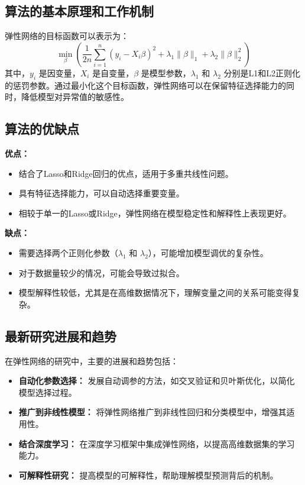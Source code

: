 \subsection*{算法的基本原理和工作机制}
弹性网络的目标函数可以表示为：
\[
    \min_{\beta} \left( \frac{1}{2n} \sum_{i=1}^{n} (y_i - X_i\beta)^2 + \lambda_1 \|\beta\|_1 + \lambda_2 \|\beta\|_2^2 \right)
\]
其中，\(y_i\) 是因变量，\(X_i\) 是自变量，\(\beta\) 是模型参数，\(\lambda_1\) 和 \(\lambda_2\) 分别是L1和L2正则化的惩罚参数。通过最小化这个目标函数，弹性网络可以在保留特征选择能力的同时，降低模型对异常值的敏感性。

\subsection*{算法的优缺点}
\textbf{优点：}
\begin{itemize}
    \item 结合了Lasso和Ridge回归的优点，适用于多重共线性问题。
    \item 具有特征选择能力，可以自动选择重要变量。
    \item 相较于单一的Lasso或Ridge，弹性网络在模型稳定性和解释性上表现更好。
\end{itemize}

\textbf{缺点：}
\begin{itemize}
    \item 需要选择两个正则化参数（\(\lambda_1\) 和 \(\lambda_2\)），可能增加模型调优的复杂性。
    \item 对于数据量较少的情况，可能会导致过拟合。
    \item 模型解释性较低，尤其是在高维数据情况下，理解变量之间的关系可能变得复杂。
\end{itemize}

\subsection*{最新研究进展和趋势}
在弹性网络的研究中，主要的进展和趋势包括：
\begin{itemize}
    \item \textbf{自动化参数选择：} 发展自动调参的方法，如交叉验证和贝叶斯优化，以简化模型选择过程。
    \item \textbf{推广到非线性模型：} 将弹性网络推广到非线性回归和分类模型中，增强其适用性。
    \item \textbf{结合深度学习：} 在深度学习框架中集成弹性网络，以提高高维数据集的学习能力。
    \item \textbf{可解释性研究：} 提高模型的可解释性，帮助理解模型预测背后的机制。
\end{itemize}

